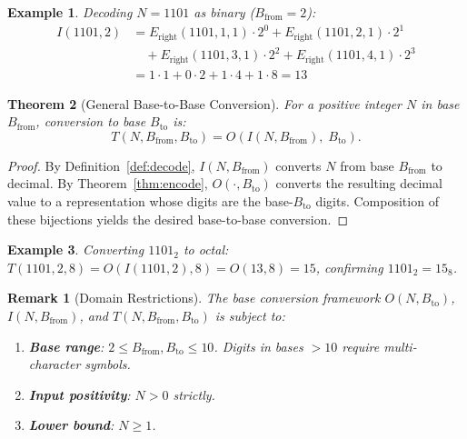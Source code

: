 \documentclass[12pt, a4paper]{article}
\theoremstyle{note}
\newtheorem{theorem}{Theorem}[section]
\newtheorem{remark}{Remark}[section]
\newtheorem{example}[theorem]{Example}
\begin{document}
\begin{example}
Decoding $N = 1101$ as binary ($B_{\text{from}} = 2$):
\begin{align*}
I(1101, 2) &= E_{\text{right}}(1101, 1, 1) \cdot 2^{0} + E_{\text{right}}(1101, 2, 1) \cdot 2^{1} \\
&\quad + E_{\text{right}}(1101, 3, 1) \cdot 2^{2} + E_{\text{right}}(1101, 4, 1) \cdot 2^{3} \\
&= 1 \cdot 1 + 0 \cdot 2 + 1 \cdot 4 + 1 \cdot 8 = 13
\end{align*}
\end{example}

\begin{theorem}[General Base-to-Base Conversion]\label{thm:convert}
For a positive integer $N$ in base $B_{\text{from}}$, conversion to base $B_{\text{to}}$ is:
\[
T(N, B_{\text{from}}, B_{\text{to}}) = O\!\left(I(N, B_{\text{from}}),\; B_{\text{to}}\right).
\]
\end{theorem}

\begin{proof}
By Definition~\ref{def:decode}, $I(N, B_{\text{from}})$ converts $N$ from base $B_{\text{from}}$ to decimal. By Theorem~\ref{thm:encode}, $O(\cdot, B_{\text{to}})$ converts the resulting decimal value to a representation whose digits are the base-$B_{\text{to}}$ digits. Composition of these bijections yields the desired base-to-base conversion.
\end{proof}

\begin{example}
Converting $1101_2$ to octal: $T(1101, 2, 8) = O(I(1101, 2), 8) = O(13, 8) = 15$, confirming $1101_2 = 15_8$.
\end{example}

\begin{remark}[Domain Restrictions]\label{rem:base_domain}
The base conversion framework $O(N, B_{\text{to}})$, $I(N, B_{\text{from}})$, and $T(N, B_{\text{from}}, B_{\text{to}})$ is subject to:
\begin{enumerate}
    \item \textbf{Base range}: $2 \leq B_{\text{from}}, B_{\text{to}} \leq 10$. Digits in bases $> 10$ require multi-character symbols.
    \item \textbf{Input positivity}: $N > 0$ strictly.
    \item \textbf{Lower bound}: $N \geq 1$.
\end{enumerate}
\end{remark}

\end{document}
